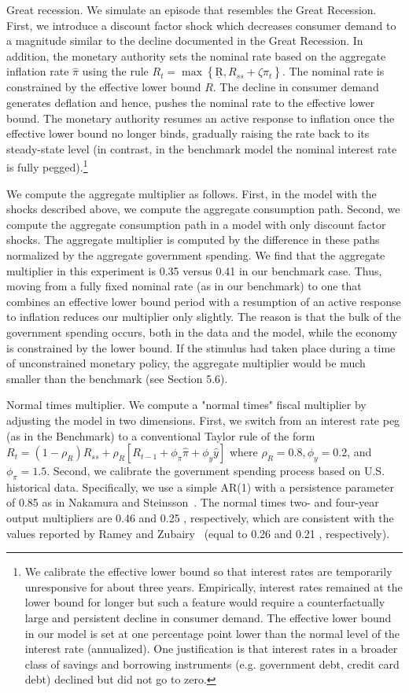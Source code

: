 \documentclass[\latexroot/\projectname]{subfiles}
\begin{document}
Great recession. We simulate an episode that resembles the Great Recession. First, we introduce a discount factor shock which decreases consumer demand to a magnitude similar to the decline documented in the Great Recession. In addition, the monetary authority sets the nominal rate based on the aggregate inflation rate $\hat{\pi}$ using the rule $R_{t}=\max \left\{\underline{\mathrm{R}}, R_{s s}+\zeta \hat{\pi}_{t}\right\}$. The nominal rate is constrained by the effective lower bound $R$. The decline in consumer demand generates deflation and hence, pushes the nominal rate to the effective lower bound. The monetary authority resumes an active response to inflation once the effective lower bound no longer binds, gradually raising the rate back to its steady-state level (in contrast, in the benchmark model the nominal interest rate is fully pegged).\footnote{We calibrate the effective lower bound so that interest rates are temporarily unresponsive for about three years. Empirically, interest rates remained at the lower bound for longer but such a feature would require a counterfactually large and persistent decline in consumer demand. The effective lower bound in our model is set at one percentage point lower than the normal level of the interest rate (annualized). One justification is that interest rates in a broader class of savings and borrowing instruments (e.g. government debt, credit card debt) declined but did not go to zero.}

We compute the aggregate multiplier as follows. First, in the model with the shocks described above, we compute the aggregate consumption path. Second, we compute the aggregate consumption path in a model with only discount factor shocks. The aggregate multiplier is computed by the difference in these paths normalized by the aggregate government spending. We find that the aggregate multiplier in this experiment is 0.35 versus 0.41 in our benchmark case. Thus, moving from a fully fixed nominal rate (as in our benchmark) to one that combines an effective lower bound period with a resumption of an active response to inflation reduces our multiplier only slightly. The reason is that the bulk of the government spending occurs, both in the data and the model, while the economy is constrained by the lower bound. If the stimulus had taken place during a time of unconstrained monetary policy, the aggregate multiplier would be much smaller than the benchmark (see Section 5.6).

Normal times multiplier. We compute a "normal times" fiscal multiplier by adjusting the model in two dimensions. First, we switch from an interest rate peg (as in the Benchmark) to a conventional Taylor rule of the form $R_{t}=\left(1-\rho_{R}\right) R_{s s}+\rho_{R}\left[R_{t-1}+\phi_{\pi} \hat{\pi}+\phi_{y} \hat{y}\right]$ where $\rho_{R}=0.8, \phi_{y}=0.2$, and $\phi_{\pi}=1.5$. Second, we calibrate the government spending process based on U.S. historical data. Specifically, we use a simple AR(1) with a persistence parameter of 0.85 as in Nakamura and Steinsson~\cite{Nakamura2011-dw}. The normal times two- and four-year output multipliers are 0.46 and 0.25 , respectively, which are consistent with the values reported by Ramey and Zubairy~\cite{Ramey2018-rc} (equal to 0.26 and 0.21 , respectively).


\smartbib

\pdfonly{
  \captionsetup[figure]{list=no}
  \captionsetup[table]{list=no}
}
\end{document}
